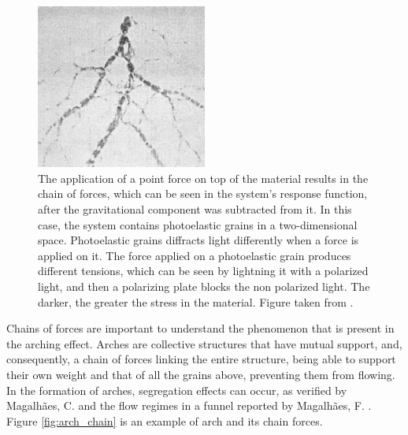 \begin{figure}
    \centering
    \includegraphics[width=0.5\textwidth]{04-figuras/Cadeia_Forca.png}
    \caption[Example of force chain.]{The application of a point force on top of the material results in the chain of forces, which can be seen in the system's response function, after the gravitational component was subtracted from it. In this case, the system contains photoelastic grains in a two-dimensional space. Photoelastic grains diffracts light differently when a force is applied on it. The force applied on a photoelastic grain produces different tensions, which can be seen by lightning it with a polarized light, and then a polarizing plate blocks the non polarized light. The darker, the greater the stress in the material. Figure taken from \cite{Sensitivity_of_Stress_Response_Function_to_Packing_Preparation}.}
    \label{fig:force_chain}
\end{figure}


    Chains of forces are important to understand the phenomenon that is present in the arching effect. Arches are collective structures that have mutual support, and, consequently, a chain of forces linking the entire structure, being able to support their own weight and that of all the grains above, preventing them from flowing. In the formation of arches, segregation effects can occur, as verified by Magalhães, C. \cite{Caio-Tese} and the flow regimes in a funnel reported by Magalhães, F. \cite{Felipe-Tese}. Figure \ref{fig:arch_chain} is an example of arch and its chain forces.

